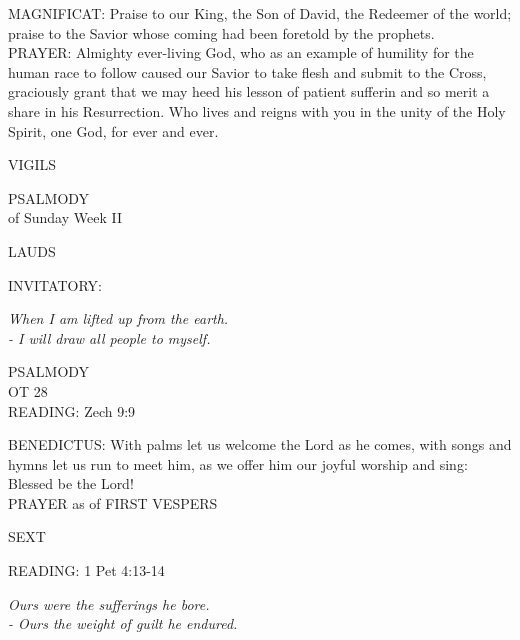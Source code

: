 \small\noindent MAGNIFICAT:	Praise to our King, the Son of David, the Redeemer of the world; praise to the Savior whose coming had been foretold by the prophets.\\

\small\noindent PRAYER:	Almighty ever-living God, who as an example of humility for the human race to follow caused our Savior to take flesh and submit to the Cross, graciously grant that we may heed his lesson of patient sufferin and so merit a share in his Resurrection. Who lives and reigns with you in the unity of the Holy Spirit, one God, for ever and ever.

\begin{flushleft}\normalsize{\uppercase{VIGILS\\}}\end{flushleft}
\noindent\small{\uppercase{Psalmody}\\} of Sunday Week II

\begin{flushleft}\normalsize{\uppercase{LAUDS\\}}\end{flushleft}
\small{\uppercase{INVITATORY:}}\normalsize
\begin{center}
\textit{When I am lifted up from the earth.\\}
\textit{- I will draw all people to myself.\\}
\end{center}
\noindent\small{\uppercase{PSALMODY}\\}
\uppercase{OT 28}\vspace{0.5em}\\

\noindent\small READING:    Zech 9:9   \textbf{\\} 

\noindent\small BENEDICTUS:	With palms let us welcome the Lord as he comes, with songs and hymns let us run to meet him, as we offer him our joyful worship and sing: Blessed be the Lord!\\

\noindent\small {PRAYER as of FIRST VESPERS\\}

\begin{flushleft}\normalsize{\uppercase{SEXT\\}}\end{flushleft}
READING:    1 Pet 4:13-14    
\begin{center}
\small\textit{Ours were the sufferings he bore.\\
- Ours the weight of guilt he endured.}\end{center}

